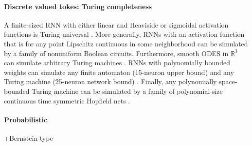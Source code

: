 \documentclass{article}
\theoremstyle{definition}
\theoremstyle{remark}
\newcommand{\reals}{\mathbb{R}}
\newcounter{ct}
\begin{document}
\paragraph{Discrete valued tokes: Turing completeness}

A finite-sized RNN with either linear and Heaviside or sigmoidal activation functions is Turing universal \citep{pollack1991induction, siegelmann1992computational,kilian1996universality}.
%
More generally, RNNs with an activation function that is for any point Lipschitz continuous in some neighborhood can be simulated by a family of nonuniform Boolean circuits\citep{siegelmann1994analog}.
%
Furthermore, smooth ODES in $\reals^3$ can simulate arbitrary Turing machines \citep{branicky1995universal}. %
%
RNNs with polynomially bounded weights can simulate any finite automaton (15-neuron upper bound) and any Turing machine (25-neuron network bound) \citep{indyk1995optimal}.
%
Finally, any polynomially space-bounded Turing machine can be simulated by a family of polynomial-size continuous time symmetric Hopfield nets \citep{sima2003continuous}.

\citep{cabessa2019turing}
\citep{perez2019turing}
\citep{dehghani2018universal, yun2019transformers}
\citep{chung2021turing}
\citep{perez2021attention}
\citep{giannou2023looped}
\citep{stogin2024provably}



\paragraph{Probabilistic}
 \citep{nowak2023representational, nowak2024representational}
+Bernstein-type \citep{veeravalli2023nonlinear}
\end{document}
